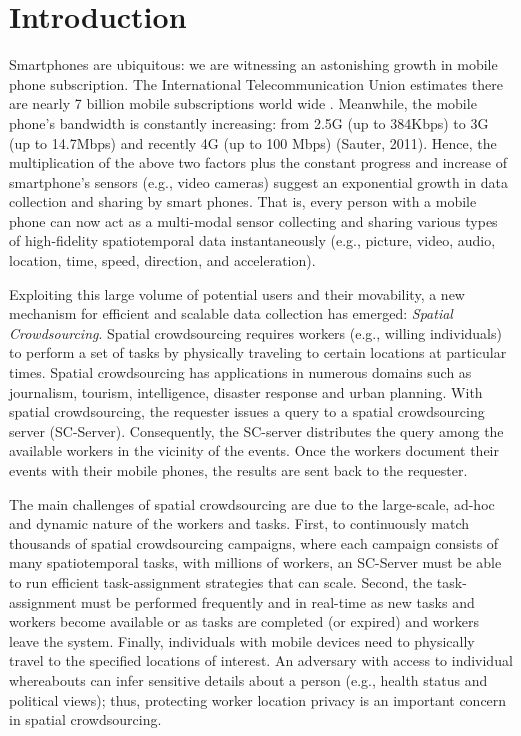 \section{Introduction}

Smartphones are ubiquitous: we are witnessing an astonishing growth in mobile phone subscription. The International Telecommunication Union estimates there are nearly 7 billion mobile subscriptions world wide \cite{Mobiforge14}. Meanwhile, the mobile phone’s bandwidth is constantly increasing: from 2.5G (up to 384Kbps) to 3G (up to 14.7Mbps) and recently 4G (up to 100 Mbps) (Sauter, 2011). Hence, the multiplication of the above two factors plus the constant progress and increase of smartphone’s sensors (e.g., video cameras) suggest an exponential growth in data collection and sharing by smart phones. That is, every person with a mobile phone can now act as a multi-modal sensor collecting and sharing various types of high-fidelity spatiotemporal data instantaneously (e.g., picture, video, audio, location, time, speed, direction, and acceleration).

Exploiting this large volume of potential users and their movability, a new mechanism for efficient and scalable data collection has emerged: \emph{Spatial Crowdsourcing}\cite{Kazemi12}. Spatial crowdsourcing requires workers (e.g., willing individuals) to perform a set of tasks by physically traveling to certain locations at particular times. Spatial crowdsourcing has applications in numerous domains such as journalism, tourism, intelligence, disaster response and urban planning. With spatial crowdsourcing, the requester issues a query to a spatial crowdsourcing server (SC-Server). Consequently, the SC-server distributes the query among the available workers in the vicinity of the events. Once the workers document their events with their mobile phones, the results are sent back to the requester.

The main challenges of spatial crowdsourcing are due to the large-scale, ad-hoc and dynamic nature of the workers and tasks.  First, to continuously match thousands of spatial crowdsourcing campaigns, where each campaign consists of many spatiotemporal tasks, with millions of workers, an SC-Server must be able to run efficient task-assignment strategies that can scale.  Second, the task-assignment must be performed frequently and in real-time as new tasks and workers become available or as tasks are completed (or expired) and workers leave the system. Finally, individuals with mobile devices need to physically travel to the specified locations of interest. An adversary with access to individual whereabouts can infer sensitive details about a person (e.g., health status and political views); thus, protecting worker location privacy is an important concern in spatial crowdsourcing.


